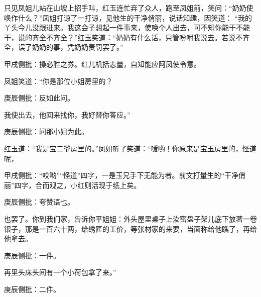 \begin{parag}
    只见凤姐儿站在山坡上招手叫，红玉连忙弃了众人，跑至凤姐前，笑问：“奶奶使唤作什么？”凤姐打谅了一打谅，见他生的干净俏丽，说话知趣，因笑道： “我的丫头今儿没跟进来。我这会子想起一件事来，使唤个人出去，可不知你能干不能干，说的齐全不齐全？”红玉笑道：“奶奶有什么话，只管吩咐我说去。若说不齐全，误了奶奶的事，凭奶奶责罚罢了。”\begin{note}甲戌侧批：操必胜之券。红儿机括志量，自知能应阿凤使令意。\end{note}凤姐笑道：“你是那位小姐房里的？\begin{note}庚辰侧批：反如此问。\end{note}我使出去，他回来找你，我好替你答应。”\begin{note}庚辰侧批：问那小姐为此。\end{note}红玉道：“我是宝二爷房里的。”凤姐听了笑道：“嗳哟！你原来是宝玉房里的，怪道呢，\begin{note}甲戌侧批：“哎哟”“怪道”四字，一是玉兄手下无能为者。前文打量生的“干净俏丽”四字，合而观之，小红则活现于纸上矣。\end{note}\begin{note}庚辰侧批：夸赞语也。\end{note}也罢了。你到我们家，告诉你平姐姐：外头屋里桌子上汝窑盘子架儿底下放著一卷银子，那是一百六十两，给绣匠的工价，等张材家的来要，当面称给他瞧了，再给他拿去。\begin{note}庚辰侧批：一件。\end{note}再里头床头间有一个小荷包拿了来。”\begin{note}庚辰侧批：二件。\end{note}
\end{parag}


